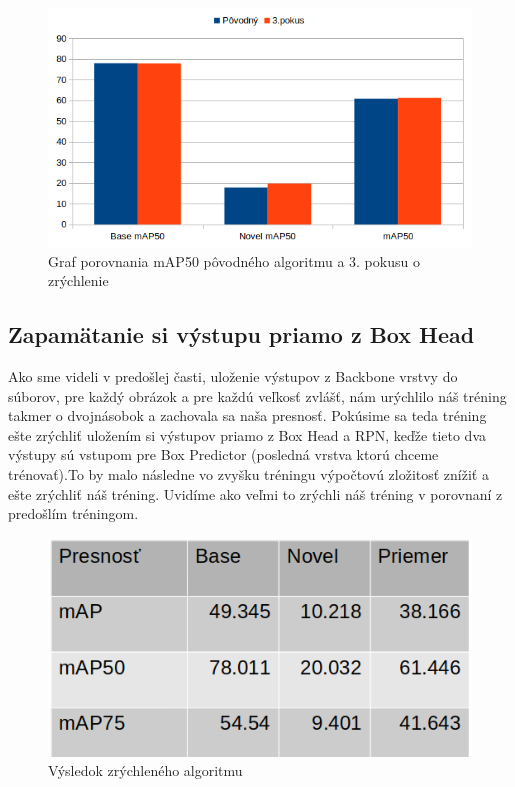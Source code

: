 \begin{figure}[H]
\centering
\includegraphics[width=\textwidth]{images/faster_3attempt_chart.png}
\caption{Graf porovnania mAP50 pôvodného algoritmu a 3. pokusu o zrýchlenie}
\label{fig:image15}
\end{figure}


\subsection{Zapamätanie si výstupu priamo z Box Head}

Ako sme videli v predošlej časti, uloženie výstupov z Backbone vrstvy do súborov, pre každý obrázok a pre každú veľkosť zvlášť, nám urýchlilo náš tréning takmer o dvojnásobok a zachovala sa naša presnosť. Pokúsime sa teda tréning ešte zrýchliť uložením si výstupov priamo z Box Head a RPN, keďže tieto dva výstupy sú vstupom pre Box Predictor (posledná vrstva ktorú chceme trénovať).To by malo následne vo zvyšku tréningu výpočtovú zložitosť znížiť a ešte zrýchliť náš tréning. Uvidíme ako veľmi to zrýchli náš tréning v porovnaní z predošlím tréningom. 

\begin{figure}[H]
\centering
\includegraphics[width=\textwidth]{images/fastest_table.png}
\caption{Výsledok zrýchleného algoritmu}
\label{fig:image16}
\end{figure}

